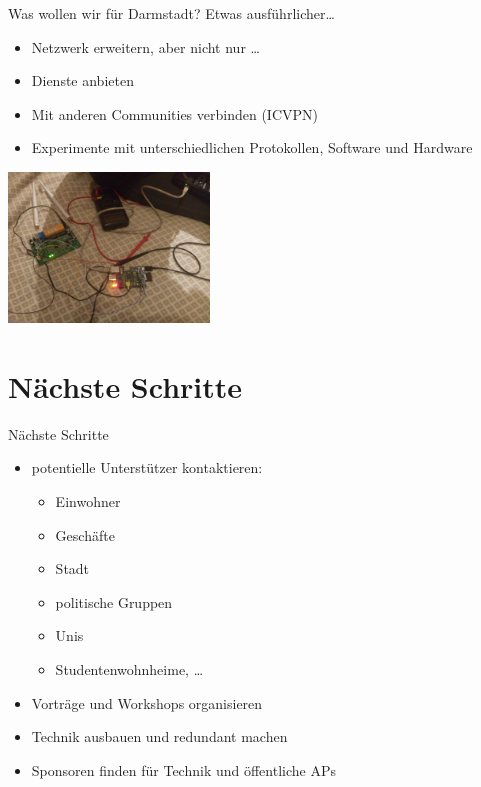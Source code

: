 \documentclass{beamer}
\begin{document}
\begin{frame}{Was wollen wir für Darmstadt?}
\vfill
Etwas ausführlicher\ldots
\begin{itemize}
\pause\item Netzwerk erweitern\pause, aber nicht nur \ldots
\pause\item Dienste anbieten
\pause\item Mit anderen Communities verbinden (ICVPN)
\pause\item Experimente mit unterschiedlichen Protokollen, Software und Hardware
\end{itemize}
\begin{center}
\vfill
\includegraphics[width=0.4\textwidth]{images/disassemble}
\end{center}
\vfill
\end{frame}

\section{Nächste Schritte}
\begin{frame}{Nächste Schritte}
\vfill
\begin{itemize}
\pause\item potentielle Unterstützer kontaktieren:
	\begin{itemize}
		\pause\item Einwohner
		\pause\item Geschäfte
		\pause\item Stadt
		\pause\item politische Gruppen
		\pause\item Unis
		\pause\item Studentenwohnheime, \ldots
	\end{itemize}
\pause\item Vorträge und Workshops organisieren
\pause\item Technik ausbauen und redundant machen
\pause\item Sponsoren finden für Technik und öffentliche APs
\end{itemize}
\vfill
\end{frame}
\end{document}
